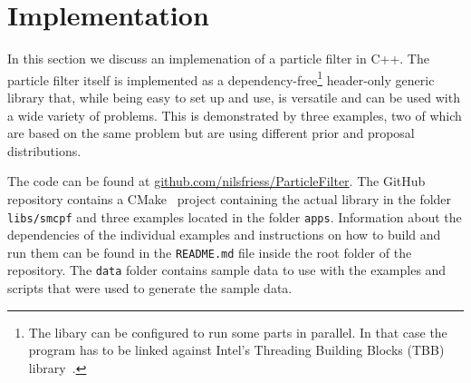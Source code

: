 \section*{Implementation}
In this section we discuss an implemenation of a particle filter in
C++. The particle filter itself is implemented as a
dependency-free\footnote{The libary can be configured to run some
  parts in parallel. In that case the program has to be linked against
  Intel's Threading Building Blocks (TBB) library~\cite{intel}.}
header-only generic library that, while being easy to set up and use,
is versatile and can be used with a wide variety of problems. This is
demonstrated by three examples, two of which are based on the same
problem but are using different prior and proposal distributions.

The code can be found at
\url{github.com/nilsfriess/ParticleFilter}. The GitHub repository
contains a CMake~\cite{cmake} project containing the actual library in
the folder \texttt{libs/smcpf} and three examples located in the
folder \texttt{apps}. Information about the dependencies of the
individual examples and instructions on how to build and run them can
be found in the \texttt{README.md} file inside the root folder of the
repository. The \texttt{data} folder contains sample data to use with
the examples and scripts that were used to generate the sample data.

